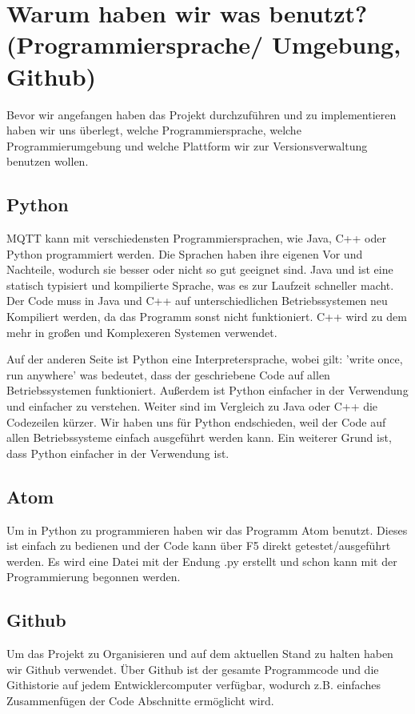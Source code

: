 \section{Warum haben wir was benutzt? (Programmiersprache/ Umgebung, Github)}
Bevor wir angefangen haben das Projekt durchzuführen und zu implementieren haben wir uns überlegt, welche Programmiersprache, welche Programmierumgebung und welche Plattform wir zur Versionsverwaltung benutzen wollen.

\subsection{Python}
MQTT kann mit verschiedensten Programmiersprachen, wie Java, C++ oder Python programmiert werden.
Die Sprachen haben ihre eigenen Vor und Nachteile, wodurch sie besser oder nicht so gut geeignet sind.
Java und ist eine statisch typisiert und kompilierte Sprache, was es zur Laufzeit schneller macht. Der Code muss in Java und C++ auf unterschiedlichen Betriebssystemen neu Kompiliert werden, da das Programm sonst nicht funktioniert.\cite{b2}
C++ wird zu dem mehr in großen und Komplexeren Systemen verwendet.\cite{b3}

Auf der anderen Seite ist Python eine Interpretersprache, wobei gilt: 'write once, run anywhere' was bedeutet, dass der geschriebene Code auf allen Betriebssystemen funktioniert.
Außerdem ist Python einfacher in der Verwendung und einfacher zu verstehen. Weiter sind im Vergleich zu Java oder C++ die Codezeilen kürzer.
Wir haben uns für Python endschieden, weil der Code auf allen Betriebssysteme einfach ausgeführt werden kann. Ein weiterer Grund ist, dass Python einfacher in der Verwendung ist.

\subsection{Atom}
Um in Python zu programmieren haben wir das Programm Atom benutzt. Dieses ist einfach zu bedienen und der Code kann über F5 direkt getestet/ausgeführt werden.
Es wird eine Datei mit der Endung .py erstellt und schon kann mit der Programmierung begonnen werden.

\subsection{Github}
Um das Projekt zu Organisieren und auf dem aktuellen Stand zu halten haben wir Github verwendet.
Über Github ist der gesamte Programmcode und die Githistorie auf jedem Entwicklercomputer verfügbar, wodurch z.B. einfaches Zusammenfügen der Code Abschnitte ermöglicht wird.\cite{b4}

